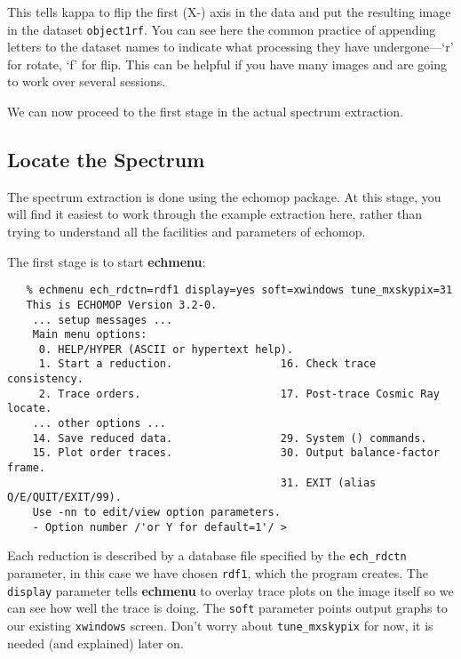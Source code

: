 \documentclass[twoside,11pt]{article}
\newcommand{\xref}[3]{#1}
\newcommand{\scspec}[2]{#1}
\newcommand{\scspec}[2]{#2}
\begin{document}
This tells {\sc kappa} to flip the first (X-) axis in the data and put
the resulting image in the dataset \verb+object1rf+\@.
You can see here the common practice of appending letters to the
dataset names to indicate what processing they have
undergone\scspec{---}{ - }`r' for rotate, `f' for flip.
This can be helpful if you have many images and are going to work
over several sessions.

We can now proceed to the first stage in the actual spectrum extraction.


\subsection{Locate the Spectrum}

The spectrum extraction is done using the \xref{{\sc echomop}}{sun152}{}
package.  At this stage, you will find it easiest to work through the
example extraction here, rather than trying to understand all the
facilities and parameters of {\sc echomop}.

The first stage is to start \xref{{\bf echmenu}}{sun152}{ECHMENU}:

{
\scspec{\small}{ }
\begin{verbatim}
   % echmenu ech_rdctn=rdf1 display=yes soft=xwindows tune_mxskypix=31
   This is ECHOMOP Version 3.2-0.
    ... setup messages ...
    Main menu options:
     0. HELP/HYPER (ASCII or hypertext help).
     1. Start a reduction.                 16. Check trace consistency.
     2. Trace orders.                      17. Post-trace Cosmic Ray locate.
    ... other options ...
    14. Save reduced data.                 29. System () commands.
    15. Plot order traces.                 30. Output balance-factor frame.
                                           31. EXIT (alias Q/E/QUIT/EXIT/99).
    Use -nn to edit/view option parameters.
    - Option number /'or Y for default=1'/ >
\end{verbatim}
}

Each reduction is described by a database file specified by the
\xref{{\tt ech\_rdctn}}{sun152}{par_ECH_RDCTN} parameter,
in this case we have chosen \verb+rdf1+, which the program creates.
The \verb+display+ parameter tells {\bf echmenu} to overlay trace
plots  on the image itself so we can see how well the trace is doing.
The \xref{{\tt soft}}{sun152}{par_SOFT} parameter points output
graphs to our existing \verb+xwindows+ screen.
Don't worry about \xref{{\tt tune\_mxskypix}}{sun152}{par_TUNE_MXSKYPIX}
for now, it is needed (and explained) later on.
\end{document}
